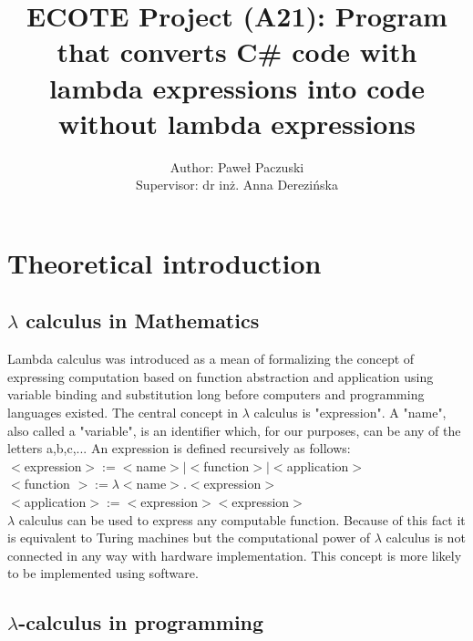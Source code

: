 \documentclass[]{report}
\title{ECOTE Project (A21):  Program that converts C\# code with lambda expressions into code without lambda expressions}
\author{Author: Paweł Paczuski \\ Supervisor: dr inż. Anna Derezińska}
\begin{document}
    \maketitle
    
    \tableofcontents
    \pagebreak
    
    \chapter{Theoretical introduction}
    \section{$\lambda$ calculus in Mathematics}
    Lambda calculus was introduced as a mean of formalizing the concept of expressing computation based on function abstraction and application using variable binding and substitution long before computers and programming languages existed. \cite{lambddef}
    The central concept in $\lambda$ calculus is "expression". A  "name",  also  called a "variable", is an identifier which, for our purposes, can be any of the letters
    a,b,c,...
    An expression is defined recursively as follows\cite{lambdintro}:\\
    $<$expression$>:=< $name$ >|< $function$ >|< $application$ > $ \\
    $<$function $>:= \lambda < $name$ >.< $expression$ > $\\
    $<$application$>:=<$expression$ >< $expression$ > $\\
    
    $\lambda$  calculus can be used to express any computable function. Because of this fact it is equivalent to Turing machines but the computational power of $\lambda$ calculus is not connected in any way with hardware implementation. This concept is more likely to be implemented using software.
    
    \section{$\lambda$-calculus in programming}
    
\end{document}
